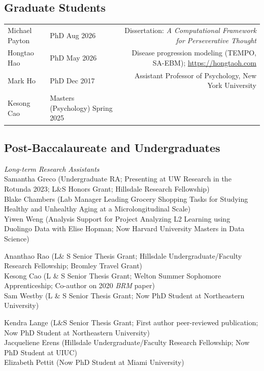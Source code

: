 \documentclass[a4paper,10pt]{article}
\begin{document}
\subsection{Graduate Students}
\begin{tabu}{XXr}
Michael Payton & PhD Aug 2026 & Dissertation: {\em A Computational Framework for Perseverative Thought} \\
Hongtao Hao & PhD May 2026 & Disease progression modeling (TEMPO, SA-EBM); \url{https://hongtaoh.com} \\
Mark Ho & PhD Dec 2017 & Assistant Professor of Psychology, New York University \\
Kesong Cao & Masters (Psychology) Spring 2025 &
\end{tabu}
\subsection{Post-Baccalaureate and Undergraduates}
{\em Long-term Research Assistants} \\
Samantha Greco (Undergraduate RA; Presenting at UW Research in the Rotunda 2023; L\&S Honors Grant; Hillsdale Research Fellowship)  \\
Blake Chambers (Lab Manager Leading Grocery Shopping Tasks for Studying Healthy and Unhealthy Aging at a Microlongitudinal Scale) \\

Yiwen Weng (Analysis Support for Project Analyzing L2 Learning using Duolingo Data with Elise Hopman; Now Harvard University Masters in Data Science)

Ananthao Rao (L\& S Senior Thesis Grant; Hillsdale Undergraduate/Faculty Research Fellowship; Bromley Travel Grant) \\

Kesong Cao (L \& S Senior Thesis Grant; Welton Summer Sophomore Apprenticeship; Co-author on 2020 {\em BRM} paper) \\ 

Sam Westby (L \& S Senior Thesis Grant; Now PhD Student at Northeastern University)

Kendra Lange (L\&S Senior Thesis Grant; First author peer-reviewed publication; Now PhD Student at Northeastern University) \\

Jacqueliene Erens (Hillsdale Undergraduate/Faculty Research Fellowship; Now PhD Student at UIUC) \\

Elizabeth Pettit (Now PhD Student at Miami University) \\
\end{document}
